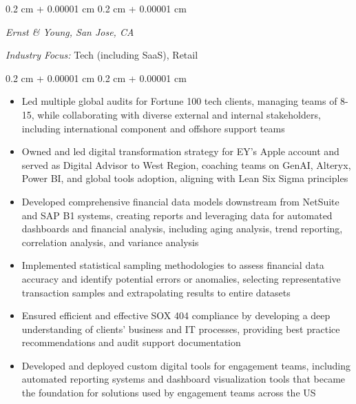 \documentclass[10pt, letterpaper]{article}
\newenvironment{highlights}{
    \begin{itemize}[
        topsep=0.10 cm,
        parsep=0.10 cm,
        partopsep=0pt,
        itemsep=0pt,
        leftmargin=0.4 cm + 10pt
    ]
}{
    \end{itemize}
} %
\newenvironment{onecolentry}{
    \begin{adjustwidth}{
        0.2 cm + 0.00001 cm
    }{
        0.2 cm + 0.00001 cm
    }
}{
    \end{adjustwidth}
} %
\begin{document}
        
        \vspace{0.10 cm}
        \begin{onecolentry}
            \textit{Ernst \& Young, San Jose, CA}
        \vspace{0.10 cm}

            \textit{Industry Focus:} Tech (including SaaS), Retail
                    \vspace{0.10 cm}

        \end{onecolentry}

        \vspace{0.10 cm}
        \begin{onecolentry}
            \begin{highlights}
                \item Led multiple global audits for Fortune 100 tech clients, managing teams of 8-15, while collaborating with diverse external and internal stakeholders, including international component and offshore support teams
                \item Owned and led digital transformation strategy for EY's Apple account and served as Digital Advisor to West Region, coaching teams on GenAI, Alteryx, Power BI, and global tools adoption, aligning with Lean Six Sigma principles
                \item Developed comprehensive financial data models downstream from NetSuite and SAP B1 systems, creating reports and leveraging data for automated dashboards and financial analysis, including aging analysis, trend reporting, correlation analysis, and variance analysis
                \item Implemented statistical sampling methodologies to assess financial data accuracy and identify potential errors or anomalies, selecting representative transaction samples and extrapolating results to entire datasets
                \item Ensured efficient and effective SOX 404 compliance by developing a deep understanding of clients' business and IT processes, providing best practice recommendations and audit support documentation
                \item Developed and deployed custom digital tools for engagement teams, including automated reporting systems and dashboard visualization tools that became the foundation for solutions used by engagement teams across the US

\end{highlights}
\end{onecolentry}
\end{document}
